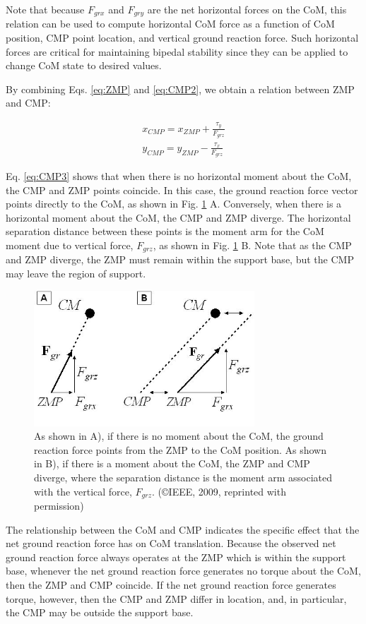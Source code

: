 \documentclass{llncs}
\begin{document}
\noindent Note that because $F_{grx}$ and $F_{gry}$ are the net horizontal forces on the CoM, this relation can be used to compute horizontal CoM force 
as a function of CoM position, CMP point location, and vertical ground reaction force.  
Such horizontal forces are critical for maintaining bipedal stability since they can be applied to change CoM state to desired values.  

By combining Eqs. \ref{eq:ZMP} and \ref{eq:CMP2}, we obtain a relation between ZMP and CMP:

\begin{eqnarray}
x_{CMP} = x_{ZMP} + \frac{\tau_y}{F_{grz}}\\
y_{CMP} = y_{ZMP} - \frac{\tau_x}{F_{grz}}
\label{eq:CMP3}
\end{eqnarray}

Eq. \ref{eq:CMP3} shows that when there is no horizontal moment about the CoM, the CMP and ZMP points coincide.  
In this case, the ground reaction force vector points directly to the CoM, as shown in Fig. \ref{fig:Fig1} A.  
Conversely, when there is a horizontal moment about the CoM, the CMP and ZMP diverge.  
The horizontal separation distance between these points is the moment arm for the CoM moment due to vertical force, $F_{grz}$, as shown in Fig. \ref{fig:Fig1} B.  
Note that as the CMP and ZMP diverge, the ZMP must remain within the support base, but the CMP may leave the region of support. 

\begin{figure}%
\includegraphics[height=2in]{Fig1}
\caption{As shown in A), if there is no moment about the CoM, the ground reaction force points from the ZMP to the CoM position.  As shown in  B),  if there is a moment about the CoM, the ZMP and CMP diverge, where the separation distance is the moment arm associated with the vertical force, $F_{grz}$.
(\copyright IEEE, 2009, reprinted with permission)}
\label{fig:Fig1}       
\end{figure}

The relationship between the CoM and CMP indicates the specific effect that the net ground reaction force has on CoM translation. 
Because the observed net ground reaction force always operates at the ZMP which is within the support base, 
whenever the net ground reaction force generates no torque about the CoM, then the ZMP and CMP coincide. 
If the net ground reaction force generates torque, however, then the CMP and ZMP differ in location, and, in particular, the CMP may be outside 
the support base. 
\end{document}
